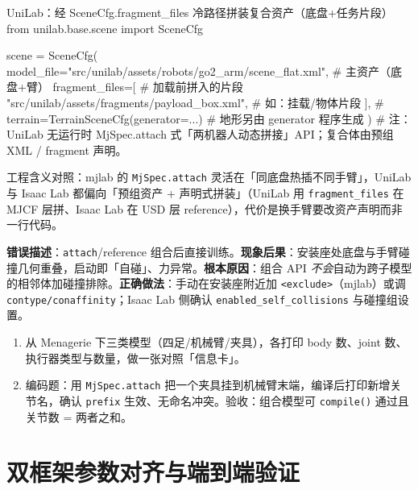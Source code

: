 \begin{codebox}[Python]{UniLab：经 SceneCfg.fragment\_files 冷路径拼装复合资产（底盘+任务片段）}
from unilab.base.scene import SceneCfg

scene = SceneCfg(
    model_file="src/unilab/assets/robots/go2_arm/scene_flat.xml",  # 主资产（底盘+臂）
    fragment_files=[                                               # 加载前拼入的片段
        "src/unilab/assets/fragments/payload_box.xml",            # 如：挂载/物体片段
    ],
    # terrain=TerrainSceneCfg(generator=...)                       # 地形另由 generator 程序生成
)
# 注：UniLab 无运行时 MjSpec.attach 式「两机器人动态拼接」API；复合体由预组 XML / fragment 声明。
\end{codebox}

工程含义对照：mjlab 的 \texttt{MjSpec.attach} 灵活在「同底盘热插不同手臂」，UniLab 与 Isaac Lab 都偏向「预组资产 + 声明式拼装」（UniLab 用 \texttt{fragment\_files} 在 MJCF 层拼、Isaac Lab 在 USD 层 reference），代价是换手臂要改资产声明而非一行代码。

\begin{pitfall}
\textbf{错误描述}：\texttt{attach}/reference 组合后直接训练。\textbf{现象后果}：安装座处底盘与手臂碰撞几何重叠，启动即「自碰」、力异常。\textbf{根本原因}：组合 API \emph{不会}自动为跨子模型的相邻体加碰撞排除。\textbf{正确做法}：手动在安装座附近加 \texttt{<exclude>}（mjlab）或调 \texttt{contype/conaffinity}；Isaac Lab 侧确认 \texttt{enabled\_self\_collisions} 与碰撞组设置。
\end{pitfall}

\begin{practice}[动手：模型库与组合]
\begin{enumerate}
  \item 从 Menagerie 下三类模型（四足/机械臂/夹具），各打印 body 数、joint 数、执行器类型与数量，做一张对照「信息卡」。
  \item 编码题：用 \texttt{MjSpec.attach} 把一个夹具挂到机械臂末端，编译后打印新增关节名，确认 \texttt{prefix} 生效、无命名冲突。验收：组合模型可 \texttt{compile()} 通过且关节数 = 两者之和。
\end{enumerate}
\end{practice}

\section{双框架参数对齐与端到端验证}
\label{sec:rlmc-assets-align}

